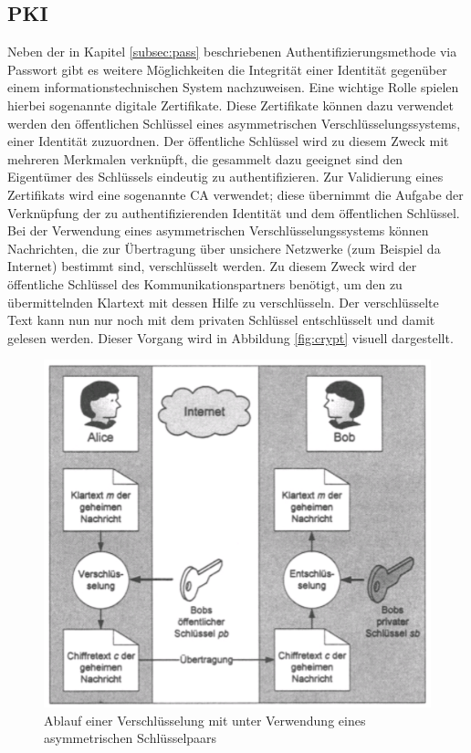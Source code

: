 \documentclass[
book,
a4paper,   
titlepage,  
halfparskip,
12pt        
]{scrartcl}
\begin{document}
\begin{onehalfspacing}
\subsection{\ac{PKI}}
\label{subsec:zert}
Neben der in Kapitel \vref{subsec:pass} beschriebenen Authentifizierungsmethode via Passwort gibt es weitere Möglichkeiten die Integrität einer Identität gegenüber einem informationstechnischen System nachzuweisen. Eine wichtige Rolle spielen hierbei sogenannte digitale Zertifikate. Diese Zertifikate können dazu verwendet werden den öffentlichen Schlüssel eines asymmetrischen Verschlüsselungssystems, einer Identität zuzuordnen. Der öffentliche Schlüssel wird zu diesem Zweck mit mehreren Merkmalen verknüpft, die gesammelt dazu geeignet sind den Eigentümer des Schlüssels eindeutig zu authentifizieren. Zur Validierung eines Zertifikats wird eine sogenannte \ac{CA} verwendet; diese übernimmt die Aufgabe der Verknüpfung der zu authentifizierenden Identität und dem öffentlichen Schlüssel.\cite[S. 145f]{kerberos2}\newline
Bei der Verwendung eines asymmetrischen Verschlüsselungssystems können Nachrichten, die zur Übertragung über unsichere Netzwerke (zum Beispiel da Internet) bestimmt sind, verschlüsselt werden. Zu diesem Zweck wird der öffentliche Schlüssel des Kommunikationspartners benötigt, um den zu übermittelnden Klartext mit dessen Hilfe zu verschlüsseln. Der verschlüsselte Text kann nun nur noch mit dem privaten Schlüssel entschlüsselt und damit gelesen werden. Dieser Vorgang wird in Abbildung \vref{fig:crypt} visuell dargestellt.\cite[S. 5]{crypto}

\begin{figure}[h]
	\centering
	\includegraphics[width=0.6\linewidth]{crypt.png}
	\caption[Ablauf Verslüsselung]{Ablauf einer Verschlüsselung mit unter Verwendung eines asymmetrischen Schlüsselpaars\cite[S. 6]{crypto}}
	\label{fig:crypt}
\end{figure}


\end{onehalfspacing}
\end{document}
